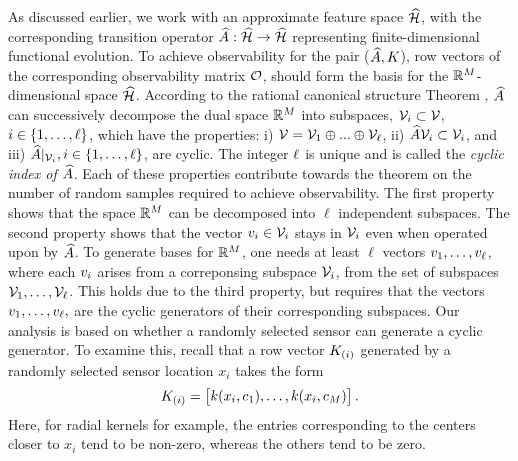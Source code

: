 As discussed earlier, we work with an approximate feature space $ \widehat{\mathcal{H}} $, with the corresponding transition operator $ \widehat{A}: \widehat{\mathcal{H}} \rightarrow \widehat{\mathcal{H}} $ representing finite-dimensional functional evolution. To achieve observability for the pair ($ \widehat{A} , K $), row vectors of the corresponding observability matrix $ \mathcal{O} $, should form the basis for the $ \mathbb{R}^M $-dimensional space $ \widehat{\mathcal{H}} $. According to the rational canonical structure Theorem \cite{wonham1974linear}, $\widehat{A}$ can successively decompose the dual space $ \mathbb{R}^M $ into subspaces, $\mathcal{V}_i \subset \mathcal{V}$, $i\in \{1,\dots,\ell\}$, which have the properties: i) $\mathcal{V} = \mathcal{V}_1 \oplus ... \oplus \mathcal{V}_{\ell}$, ii) $\widehat{A}\mathcal{V}_i \subset \mathcal{V}_i$, and iii) $\widehat{A}|_{\mathcal{V}_i}, i \in \{1,\dots,\ell\}$, are cyclic. The integer $\ell$ is unique and is called the \emph{cyclic index of $\widehat{A}$}.  Each of these properties contribute towards the theorem on the number of random samples required to achieve observability. The first property shows that the space $ \mathbb{R}^M $ can be decomposed into $ \ell $ independent subspaces. The second property shows that the vector $ v_i \in \mathcal{V}_i $ stays in $ \mathcal{V}_i $ even when operated upon by $ \widehat{A} $. To generate bases for $ \mathbb{R}^M $, one needs at least $ \ell $ vectors $ v_1, \dots,v_\ell $, where each $v_i$ arises from a correponsing subspace $\mathcal{V}_i$, from the set of subspaces $ \mathcal{V}_1,\dots,\mathcal{V}_\ell $. This holds due to the third property, but requires that the vectors  $ v_1, \dots,v_\ell, $ are the cyclic generators of their corresponding subspaces. Our analysis is based on whether a randomly selected sensor can generate a cyclic generator. To examine this, recall that a row vector $ K_{(i)} $ generated by a randomly selected sensor location $ x_i $ takes the form
\begin{equation}\label{eq:rowvec}
K_{(i)} = \begin{bmatrix} k(x_i,c_1),\dots,k(x_i,c_M) \end{bmatrix}.
\end{equation}
Here, for radial kernels for example, the entries corresponding to the centers closer to $ x_i $ tend to be non-zero, whereas the others tend to be zero.  

